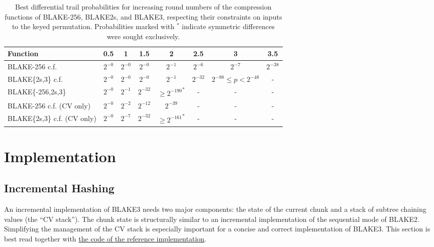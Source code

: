 \documentclass[11pt,notitlepage,a4paper]{article}
\begin{document}
\begin{table}
\centering
\caption{Best differential trail probabilities for increasing round numbers of the compression functions of BLAKE-256, BLAKE2s, and BLAKE3, respecting their constraints on inputs to the keyed permutation. Probabilities marked with ${}^\ast$ indicate symmetric differences were sought exclusively.}%
\label{tab:trails}
\begin{tabular}{lccccccc}
  \toprule
  Function & 0.5   & 1     & 1.5   & 2     & 2.5   & 3     & 3.5 \\ \midrule
  BLAKE-256 c.f. & $2^{-0}$ & $2^{-0}$ & $2^{-0}$ & $2^{-1}$ & $2^{-6}$ & $2^{-7}$ & $2^{-38}$  \\
  BLAKE\{2s,3\} c.f.   &  $2^{-0}$  & $2^{-0}$ &  $2^{-0}$  & $2^{-1}$ & $2^{-32}$   & $2^{-88} \le p<2^{-48}$ & -  \\
  BLAKE\{-256,2s,3\} & $2^{-0}$ & $2^{-1}$ & $2^{-32}$ & ${\ge 2^{-190}}^\ast$ & - & - & -  \\ %
  BLAKE-256 c.f. (CV only) & $2^{-0}$ & $2^{-2}$ & $2^{-12}$ & $2^{-39}$ & - & - & - \\
  BLAKE\{2s,3\} c.f. (CV only) & $2^{-0}$ & $2^{-7}$ & $2^{-32}$ & ${\ge 2^{-161}}^\ast$ & - & - & - \\ %
  \bottomrule
\end{tabular}
\end{table}

\section{Implementation}\label{sec:implementation}

\subsection{Incremental Hashing}\label{sec:incremental}

An incremental implementation of BLAKE3 needs two major components: the state
of the current chunk and a stack of subtree chaining values (the ``CV stack'').
The chunk state is structurally similar to an incremental implementation of the
sequential mode of BLAKE2. Simplifying the management of the CV stack is
especially important for a concise and correct implementation of BLAKE3. This
section is best read together with
\href{https://github.com/veorq/BLAKE3/blob/master/reference_impl/reference_impl.rs}{the code of the reference implementation}.
\end{document}
